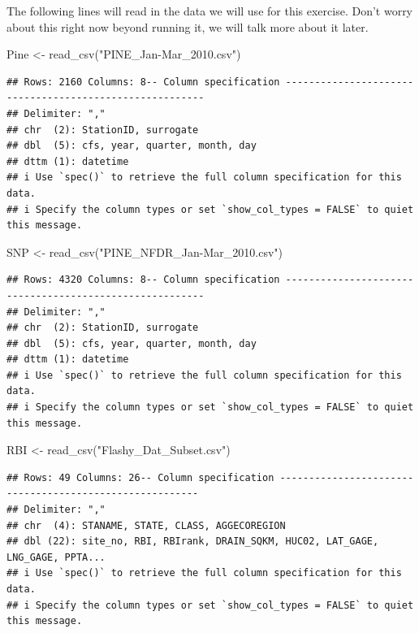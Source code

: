 \documentclass[
]{book}
\newenvironment{Shaded}{\begin{snugshade}}{\end{snugshade}}
\newcommand{\FunctionTok}[1]{\textcolor[rgb]{0.00,0.00,0.00}{#1}}
\newcommand{\NormalTok}[1]{#1}
\newcommand{\OtherTok}[1]{\textcolor[rgb]{0.56,0.35,0.01}{#1}}
\newcommand{\StringTok}[1]{\textcolor[rgb]{0.31,0.60,0.02}{#1}}
\begin{document}
The following lines will read in the data we will use for this exercise. Don't worry about this right now beyond running it, we will talk more about it later.

\begin{Shaded}
\begin{Highlighting}[]
\NormalTok{Pine }\OtherTok{\textless{}{-}} \FunctionTok{read\_csv}\NormalTok{(}\StringTok{"PINE\_Jan{-}Mar\_2010.csv"}\NormalTok{) }
\end{Highlighting}
\end{Shaded}

\begin{verbatim}
## Rows: 2160 Columns: 8-- Column specification --------------------------------------------------------
## Delimiter: ","
## chr  (2): StationID, surrogate
## dbl  (5): cfs, year, quarter, month, day
## dttm (1): datetime
## i Use `spec()` to retrieve the full column specification for this data.
## i Specify the column types or set `show_col_types = FALSE` to quiet this message.
\end{verbatim}

\begin{Shaded}
\begin{Highlighting}[]
\NormalTok{SNP }\OtherTok{\textless{}{-}} \FunctionTok{read\_csv}\NormalTok{(}\StringTok{"PINE\_NFDR\_Jan{-}Mar\_2010.csv"}\NormalTok{)}
\end{Highlighting}
\end{Shaded}

\begin{verbatim}
## Rows: 4320 Columns: 8-- Column specification --------------------------------------------------------
## Delimiter: ","
## chr  (2): StationID, surrogate
## dbl  (5): cfs, year, quarter, month, day
## dttm (1): datetime
## i Use `spec()` to retrieve the full column specification for this data.
## i Specify the column types or set `show_col_types = FALSE` to quiet this message.
\end{verbatim}

\begin{Shaded}
\begin{Highlighting}[]
\NormalTok{RBI }\OtherTok{\textless{}{-}} \FunctionTok{read\_csv}\NormalTok{(}\StringTok{"Flashy\_Dat\_Subset.csv"}\NormalTok{)}
\end{Highlighting}
\end{Shaded}

\begin{verbatim}
## Rows: 49 Columns: 26-- Column specification --------------------------------------------------------
## Delimiter: ","
## chr  (4): STANAME, STATE, CLASS, AGGECOREGION
## dbl (22): site_no, RBI, RBIrank, DRAIN_SQKM, HUC02, LAT_GAGE, LNG_GAGE, PPTA...
## i Use `spec()` to retrieve the full column specification for this data.
## i Specify the column types or set `show_col_types = FALSE` to quiet this message.
\end{verbatim}
\end{document}

